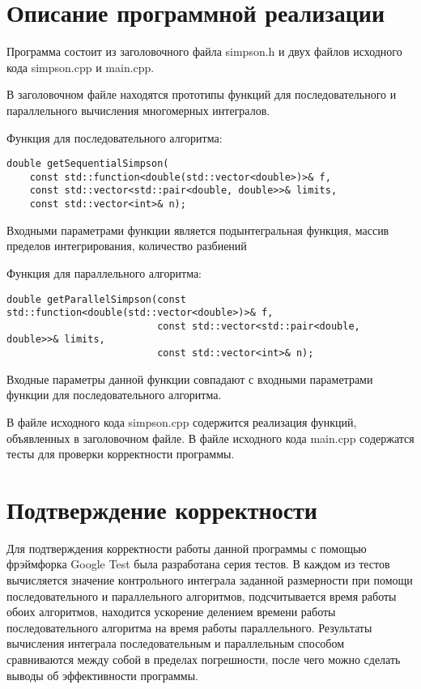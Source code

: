\documentclass{report}
\begin{document}
\section*{Описание программной реализации}
Программа состоит из заголовочного файла simpson.h и двух файлов исходного кода simpson.cpp и main.cpp.
\par В заголовочном файле находятся прототипы функций для последовательного и параллельного вычисления многомерных интегралов.
\par Функция для последовательного алгоритма:
\begin{lstlisting}
double getSequentialSimpson(
    const std::function<double(std::vector<double>)>& f,
    const std::vector<std::pair<double, double>>& limits,
    const std::vector<int>& n);
\end{lstlisting}
Входными параметрами функции является подынтегральная функция, массив пределов интегрирования, количество разбиений
\par Функция для параллельного
алгоритма:
\begin{lstlisting}
double getParallelSimpson(const std::function<double(std::vector<double>)>& f,
                          const std::vector<std::pair<double, double>>& limits,
                          const std::vector<int>& n);
\end{lstlisting}
Входные параметры данной функции совпадают с входными параметрами функции для последовательного алгоритма.
\par В файле исходного кода simpson.cpp содержится реализация функций, объявленных в заголовочном файле. В файле исходного кода main.cpp содержатся тесты для проверки корректности программы.
\newpage

\section*{Подтверждение корректности}
Для подтверждения корректности работы данной программы с помощью фрэймфорка Google Test была разработана серия тестов. В каждом из тестов вычисляется значение контрольного  интеграла заданной размерности при помощи последовательного и параллельного алгоритмов, подсчитывается время работы обоих алгоритмов, находится ускорение делением времени работы последовательного алгоритма на время работы параллельного. Результаты вычисления интеграла последовательным и параллельным способом сравниваются между собой в пределах погрешности, после чего можно сделать выводы об эффективности программы.
\end{document}
